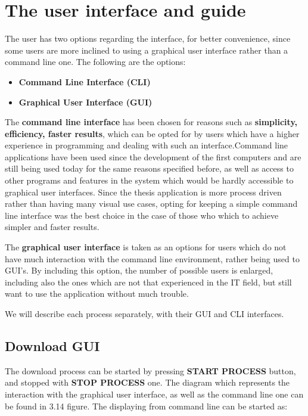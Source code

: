 \documentclass[12pt, a4paper]{report}
\begin{document}
	
	
	
	
	\section{The user interface and guide}
	
	The user has two options regarding the interface, for better convenience, since some users are more inclined to using a graphical user interface rather than a command line one. The following are the options:
	\begin{itemize}
		\item \textbf{Command Line Interface (CLI)}
		\item \textbf{Graphical User Interface (GUI)}
	\end{itemize}
	
	The \textbf{command line interface} has been chosen for reasons such as \textbf{simplicity, efficiency, faster results}, which can be opted for by users which have a higher experience in programming and dealing with such an interface.Command line applications have been used since the development of the first computers and are still being used today for the same reasons specified before, as well as access to other programs and features in the system which would be hardly accessible to graphical user interfaces. Since the thesis application is more process driven rather than having many visual use cases, opting for keeping a simple command line interface was the best choice in the case of those who which to achieve simpler and faster results.
	
	The \textbf{graphical user interface} is taken as an options for users which do not have much interaction with the command line environment, rather being used to GUI's. By including this option, the number of possible users is enlarged, including also the ones which are not that experienced in the IT field, but still want to use the application without much trouble.
	
	We will describe each process separately, with their GUI and CLI interfaces.
	
	\subsection{Download GUI}
	The download process can be started by pressing \textbf{START PROCESS} button, and stopped with \textbf{STOP PROCESS} one. The diagram which represents the interaction with the graphical user interface, as well as the command line one can be found in 3.14 figure. The displaying from command line can be started as:
	
\end{document}
